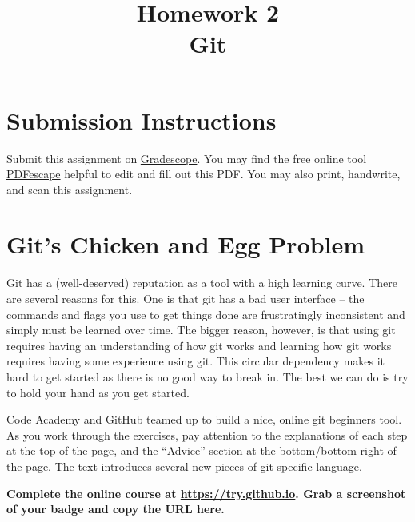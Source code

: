 \documentclass{article}
\begin{document}
\fancyhead[L]{}
\fancyhead[R]{}

\fancyfoot[C]{\thepage~/~\pageref*{LastPage}}
\pagestyle{fancyplain}


\title{\textbf{Homework 2\\Git}}
\author{\textbf{\color{red}{Due: Wednesday, September 27, 11:59PM (Hard Deadline)}}}
\date{}
\maketitle


\section*{Submission Instructions}
Submit this assignment on \href{https://gradescope.com/courses/9999}{Gradescope}.
You may find the free online tool \href{https://www.pdfescape.com}{PDFescape}
helpful to edit and fill out this PDF.
You may also print, handwrite, and scan this assignment.

\section{Git's Chicken and Egg Problem}

Git has a (well-deserved) reputation as a tool with a high learning curve.
There are several reasons for this. One is that git has a bad user interface
-- the commands and flags you use to get things done are frustratingly
inconsistent and simply must be learned over time.
The bigger reason, however, is that using git requires having an understanding
of how git works and learning how git works requires having some experience
using git. This circular dependency makes it hard to get started as there is
no good way to break in. The best we can do is try to hold your hand as you
get started.

\medskip
\noindent
Code Academy and GitHub teamed up to build a nice, online git beginners tool.
As you work through the exercises, pay attention to the explanations of each
step at the top of the page, and the ``Advice'' section at the
bottom/bottom-right of the page. The text introduces several new pieces of
git-specific language.

\medskip
\noindent
\textbf{Complete the online course at \url{https://try.github.io}. Grab a
  screenshot of your badge and copy the URL here.
  \color{red}{\small (You will need to sign in or create an account get your badge)}
}
\end{document}
